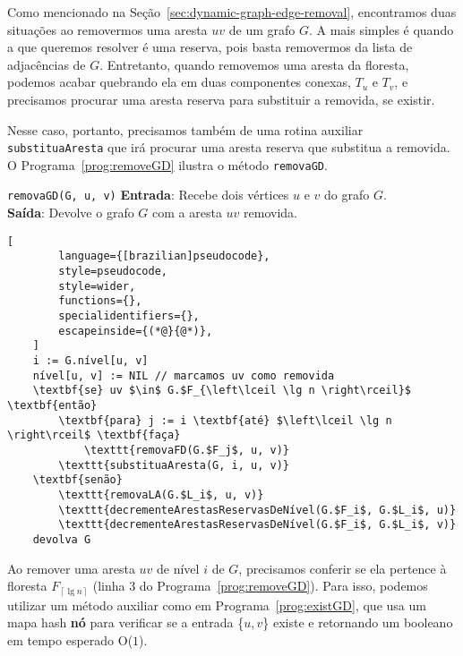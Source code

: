Como mencionado na Seção~\ref{sec:dynamic-graph-edge-removal}, encontramos duas situações ao removermos uma aresta $uv$ de um grafo $G$. A mais simples é quando a que queremos resolver é uma reserva, pois basta removermos da lista de adjacências de $G$. Entretanto, quando removemos uma aresta da floresta, podemos acabar quebrando ela em duas componentes conexas, $T_u$ e $T_v$, e precisamos procurar uma aresta reserva para substituir a removida, se existir. 

Nesse caso, portanto, precisamos também de uma rotina auxiliar \texttt{substituaAresta} que irá procurar uma aresta reserva que substitua a removida. O Programa~\ref{prog:removeGD} ilustra o método \texttt{removaGD}.

\begin{programruledcaption}{\texttt{removaGD(G, u, v)} \label{prog:removeGD}}
    \noindent\textbf{Entrada}: Recebe dois vértices $u$ e $v$ do grafo $G$. \\
    \textbf{Saída}: Devolve o grafo $G$ com a aresta $uv$ removida.
    \vspace{-0.5\baselineskip}
    \begin{lstlisting}[
        language={[brazilian]pseudocode},
        style=pseudocode,
        style=wider,
        functions={},
        specialidentifiers={},
        escapeinside={(*@}{@*)},
    ]
    i := G.nível[u, v]
    nível[u, v] := NIL // marcamos uv como removida
    \textbf{se} uv $\in$ G.$F_{\left\lceil \lg n \right\rceil}$ \textbf{então}
        \textbf{para} j := i \textbf{até} $\left\lceil \lg n \right\rceil$ \textbf{faça}
            \texttt{removaFD(G.$F_j$, u, v)}
        \texttt{substituaAresta(G, i, u, v)}
    \textbf{senão}
        \texttt{removaLA(G.$L_i$, u, v)}
        \texttt{decrementeArestasReservasDeNível(G.$F_i$, G.$L_i$, u)}
        \texttt{decrementeArestasReservasDeNível(G.$F_i$, G.$L_i$, v)}
    devolva G
    \end{lstlisting}
    \vspace{-0.5\baselineskip}
\end{programruledcaption}

Ao remover uma aresta $uv$ de nível $i$ de $G$, precisamos conferir se ela pertence à floresta $F_{\left\lceil \lg n \right\rceil}$ (linha $3$ do Programa~\ref{prog:removeGD}). Para isso, podemos utilizar um método auxiliar como em Programa~\ref{prog:existGD}, que usa um mapa hash \textbf{nó} para verificar se a entrada \{$u, v$\} existe e retornando um booleano em tempo esperado O($1$).

